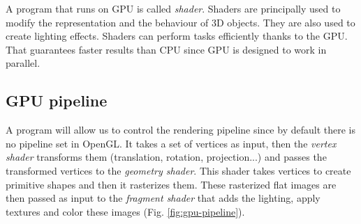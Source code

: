 A program that runs on GPU is called \textit{shader}. Shaders are principally used to modify the representation and the behaviour of 3D objects. They are also used to create lighting effects. Shaders can perform tasks efficiently thanks to the GPU. That guarantees faster results than CPU since GPU is designed to work in parallel.

\subsection{GPU pipeline}
A program will allow us to control the rendering pipeline since by default there is no pipeline set in OpenGL. It takes a set of vertices as input, then the \textit{vertex shader} transforms them (translation, rotation, projection...) and passes the transformed vertices to the \textit{geometry shader}. This shader takes vertices to create primitive shapes and then it rasterizes them. These rasterized flat images are then passed as input to the \textit{fragment shader} that adds the lighting, apply textures and color these images (Fig. \ref{fig:gpu-pipeline}).

